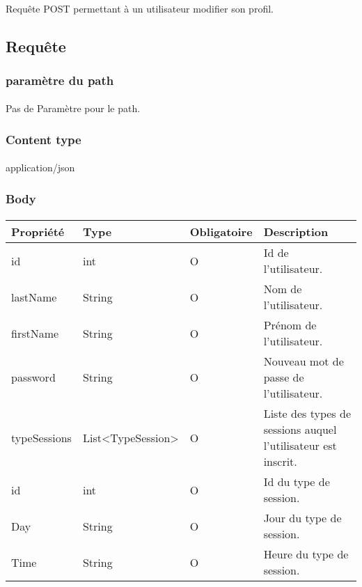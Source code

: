 \paragraph{}
	Requête POST permettant à un utilisateur modifier son profil.

\subsection{Requête}
	\subsubsection{paramètre du path}
		\paragraph{}
			Pas de Paramètre pour le path.
	
	\subsubsection{Content type}
		\paragraph{}
			application/json
			
	\subsubsection{Body}
		\paragraph{}
			\begin{center}
				\begin{tabularx}{\textwidth}{| T{0.2122\textwidth} | S{0.22\textwidth} | S{0.15\textwidth} | S{0.3\textwidth} |}
					\hline
					Propriété & Type & Obligatoire & Description \\
					\hline
					id & int & O & Id de l'utilisateur. \\
					\hline
					lastName & String & O & Nom de l'utilisateur. \\
					\hline
					firstName & String & O & Prénom de l'utilisateur. \\
					\hline
					password & String & O & Nouveau mot de passe de l'utilisateur. \\
					\hline
					typeSessions & List<TypeSession> & O & Liste des types de sessions auquel l'utilisateur est inscrit. \\
					\hline
					
					\hline
					
					\hline
					id & int & O & Id du type de session. \\
					\hline 
					Day & String & O & Jour du type de session. \\
					\hline
					Time & String & O & Heure du type de session. \\
					\hline
				\end{tabularx}
			\end{center}
			
